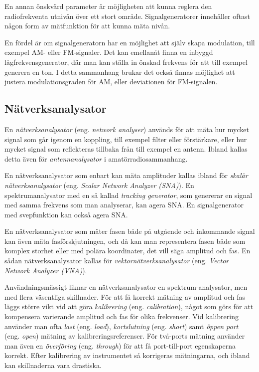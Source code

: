 En annan önskvärd parameter är möjligheten att kunna reglera den radiofrekventa
utnivån över ett stort område.
Signalgeneratorer innehåller oftast någon form av mätfunktion för att kunna
mäta nivån.

En fördel är om signalgeneratorn har en möjlighet att själv skapa modulation,
till exempel AM- eller FM-signaler.
Det kan emellanåt finna en inbyggd lågfrekvensgenerator, där man kan ställa in
önskad frekvens för att till exempel generera en ton.
I detta sammanhang brukar det också finnas möjlighet att justera
modulationsgraden för AM, eller deviationen för FM-signalen.

\subsection{Nätverksanalysator}
\label{nätverksanalysator}
\label{network analyzer}
\label{antennanalysator}
\label{skalär nätverksanalysator}
\label{Scalar Network Analyzer (SNA)}
\label{SNA}
\label{tracking generator}
\label{vektornätverksanalysator}
\label{Vector Network Analyzer (VNA)}
\label{VNA}

En \emph{nätverksanalysator} (eng. \emph{network analyser}) används för att
mäta hur mycket signal som går igenom en koppling, till exempel filter eller
förstärkare, eller hur mycket signal som reflekteras tillbaka från till exempel en
antenn.
Ibland kallas detta även för \emph{antennanalysator} i amatörradiosammanhang.

En nätverksanalysator som enbart kan mäta amplituder kallas ibland för
\emph{skalär nätverksanalysator} (eng. \emph{Scalar Network Analyzer (SNA)}).
En spektrumanalysator med en så kallad \emph{tracking generator}, som genererar
en signal med samma frekvens som man analyserar, kan agera SNA.
En signalgenerator med svepfunktion kan också agera SNA.

En nätverksanalysator som mäter fasen både på utgående och inkommande signal
kan även mäta fasförskjutningen, och då kan man representera fasen både som
komplex storhet eller med polära koordinater, det vill säga amplitud och fas.
En sådan nätverksanalysator kallas för \emph{vektornätverksanalysator} (eng.
\emph{Vector Network Analyzer (VNA)}).

Användningsmässigt liknar en nätverksanalysator en spektrum-analysator, men
med flera väsentliga skillnader.
För att få korrekt mätning av amplitud och fas läggs större vikt vid att göra
\emph{kalibrering} (eng. \emph{calibration}), något som görs för att kompensera
varierande amplitud och fas för olika frekvenser.
Vid kalibrering använder man ofta \emph{last} (eng. \emph{load}),
\emph{kortslutning} (eng. \emph{short}) samt \emph{öppen port} (eng.
\emph{open}) mätning av kalibreringsreferenser.
För två-ports mätning använder man även en \emph{överföring} (eng.
\emph{through}) för att få port-till-port egenskaperna korrekt.
Efter kalibrering av instrumentet så korrigeras mätningarna, och ibland kan
skillnaderna vara drastiska.

